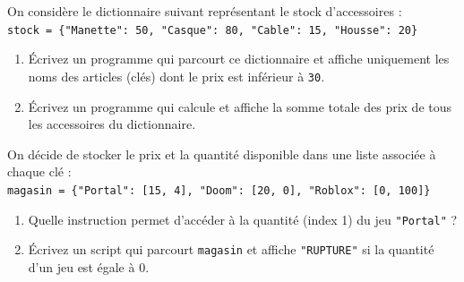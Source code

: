 \begin{Exercise}[title={Algorithmes de recherche}]
On considère le dictionnaire suivant représentant le stock d'accessoires : \\
\texttt{stock = \{"Manette": 50, "Casque": 80, "Cable": 15, "Housse": 20\}}
\begin{enumerate}
    \item Écrivez un programme qui parcourt ce dictionnaire et affiche uniquement les noms des articles (clés) dont le prix est inférieur à \texttt{30}.
    \item Écrivez un programme qui calcule et affiche la somme totale des prix de tous les accessoires du dictionnaire.
\end{enumerate}
\end{Exercise}

\begin{Exercise}[title={Bonus : Structures imbriquées}]
On décide de stocker le prix et la quantité disponible dans une liste associée à chaque clé : \\
\texttt{magasin = \{"Portal": [15, 4], "Doom": [20, 0], "Roblox": [0, 100]\}}
\begin{enumerate}
    \item Quelle instruction permet d'accéder à la quantité (index 1) du jeu \texttt{"Portal"} ?
    \item Écrivez un script qui parcourt \texttt{magasin} et affiche \texttt{"RUPTURE"} si la quantité d'un jeu est égale à 0.
\end{enumerate}
\end{Exercise}